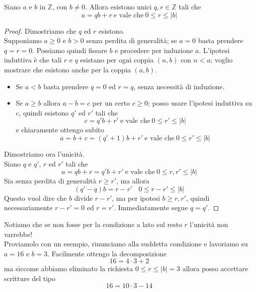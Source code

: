 \begin{teorema} Siano $a$ e $b$ in $\mathbb{Z}$, con $b \neq 0$. Allora esistono unici $q,r \in \mathbb{Z}$ tali che 
	\begin{equation*}
	a = qb + r \ \text{e vale che} \ 0 \leq r \leq |b|
	\end{equation*}
\end{teorema}
\begin{proof}
	Dimostriamo che $q$ ed $r$ esistono. \\ Supponiamo $a\geq 0$ e $b>0$ senza perdita di generalità; se $a=0$ basta prendere $q=r=0$. Possiamo quindi fissare $b$ e procedere per induzione $a$. L'ipotesi induttiva è che tali $r$ e $q$ esistano per ogni coppia $(n,b)$ con $n<a$; voglio mostrare che esistono anche per la coppia $(a,b)$.
	\begin{itemize}
		\item Se $a<b$ basta prendere $q=0$ ed $r=q$, senza necessità di induzione.
		\item Se $a\geq b$ allora $a-b=c$ per un certo $c\geq 0$; posso usare l'ipotesi induttiva su $c$, quindi esistono $q'$ ed $r'$ tali che 
		\begin{equation*}
		c = q'b + r' \ \text{e vale che} \ 0 \leq r' \leq |b|
		\end{equation*}
		e chiaramente ottengo subito
		\begin{equation*}
		a = b+c = (q'+1)b + r' \ \text{e vale che} \ 0 \leq r' \leq |b|
		\end{equation*}
	\end{itemize}
	Dimostriamo ora l'unicità. \\
	Siano $q$ e $q'$, $r$ ed $r'$ tali che 
	\begin{equation*}
	a = qb + r= q'b + r'\ \text{e vale che} \ 0 \leq r,r' \leq |b|
	\end{equation*}
	Sia senza perdita di generalità $r \geq r'$, ma allora
	\begin{equation*}
	(q'-q)b=r-r' \ \ \ \ 0 \leq r-r' \leq |b|
	\end{equation*}
	Questo vuol dire che $b$ divide $r-r'$, ma per ipotesi $b\geq r,r'$,
	quindi necessariamente $r-r'=0$ ed $r=r'$. Immediatamente segue $q=q'$. 
\end{proof}
\begin{controesempio}
	Notiamo che se non fosse per la condizione a lato sul resto $r$ l'unicità non varrebbe! \\ Proviamolo con un esempio, rinunciamo alla suddetta condizione e lavoriamo su $a=16$ e $b=3$. Facilmente ottengo la decomposizione
	\begin{equation*}
	16 = 4\cdot3+2
	\end{equation*}
	ma siccome abbiamo eliminato la richiesta $0\leq r \leq |b|=3$ allora posso accettare scritture del tipo
	\begin{equation*}
	16=10\cdot3-14
	\end{equation*}
\end{controesempio}
